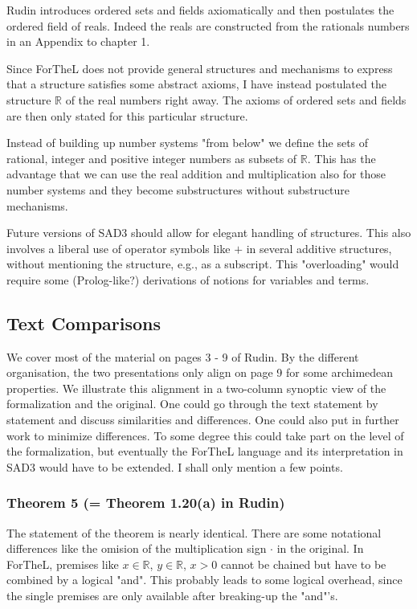 \documentclass{article}
\newcommand{\RR}{\mathbb{R}}
\begin{document}
Rudin introduces ordered sets and fields axiomatically and then postulates the ordered field of reals. Indeed the reals are constructed from the rationals numbers in an Appendix to chapter 1.

Since ForTheL does not provide general structures and mechanisms to express that a structure satisfies some abstract axioms, I have instead postulated the structure $\mathbb{R}$ of the real numbers right away. The axioms of ordered sets and fields are then only stated for this particular structure.

Instead of building up number systems "from below" we define the sets of rational, integer and positive integer numbers as subsets of $\mathbb{R}$. This has the advantage that we can use the real addition and multiplication also for those number systems and they become substructures without substructure mechanisms.

Future versions of SAD3 should allow for elegant handling of structures. This also involves a liberal use of operator symbols like $+$ in several additive structures, without mentioning the structure, e.g., as a subscript. This "overloading" would require some (Prolog-like?) derivations of notions for variables and terms.

\subsection{Text Comparisons}

We cover most of the material on pages 3 - 9 of Rudin. By the different organisation, the two presentations only align on page 9 for some archimedean properties. We illustrate this alignment in a two-column synoptic view of the formalization and the original. One could go through the text statement by statement and discuss similarities and differences. One could also put in further work to minimize differences. To some degree this could take part on the level of the formalization, but eventually the ForTheL language and its interpretation in SAD3 would have to be extended.
I shall only mention a few points.

\subsubsection{Theorem 5 (= Theorem 1.20(a) in Rudin)} 

The statement of the theorem is nearly identical. There are some notational differences like the omision of the multiplication sign $\cdot$ in the original. In ForTheL, premises like $x \in \RR$, $y \in \RR$, $x > 0$ cannot be chained but have to be combined by a logical "and". This probably leads to some logical overhead, since the single premises are only available after breaking-up the "and"'s.
\end{document}

